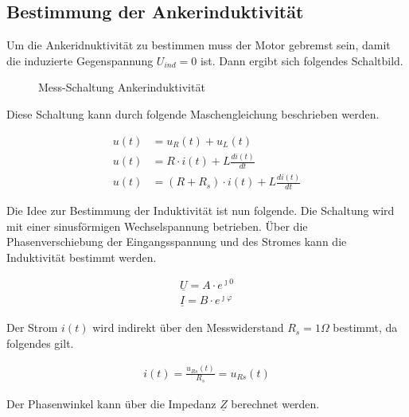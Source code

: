 \subsection{Bestimmung der Ankerinduktivität}

Um die Ankeridnuktivität zu bestimmen muss der Motor gebremst sein,
damit die induzierte Gegenspannung $U_{ind} = 0$ ist. Dann ergibt sich
folgendes Schaltbild.


\begin{figure}[H]
    \centering
    \caption{Mess-Schaltung Ankerinduktivität}
    \label{fig:PlotAufgabe1}
   \end{figure}

Diese Schaltung kann durch folgende Maschengleichung beschrieben werden.

\begin{equation} \label{eq211}
    \begin{split}
        u(t)&=u_R(t) + u_L(t)\\
        u(t)&=R \cdot i(t) + L \frac{d i(t)}{dt}\\
        u(t)&= (R+R_s) \cdot i(t) + L \frac{d i(t)}{dt}
    \end{split}
\end{equation}

Die Idee zur Bestimmung der Induktivität ist nun folgende. Die Schaltung
wird mit einer sinusförmigen Wechselspannung betrieben. Über die
Phasenverschiebung der Eingangsspannung und des Stromes kann die Induktivität
bestimmt werden.

\begin{equation} \label{eq212}
    \begin{split}
        \underline{U} = A \cdot e^{\jmath 0}\\
        \underline{I} = B \cdot e^{\jmath \varphi}
    \end{split}
\end{equation}

Der Strom $i(t)$ wird indirekt über den Messwiderstand $R_s= 1\Omega$
bestimmt, da folgendes gilt.

\begin{equation} \label{eq213}
    \begin{split}
        i(t)=\frac{u_{Rs}(t)}{R_s} = u_{Rs}(t)
    \end{split}
\end{equation}

Der Phasenwinkel kann über die Impedanz $\underline{Z}$ berechnet werden.

